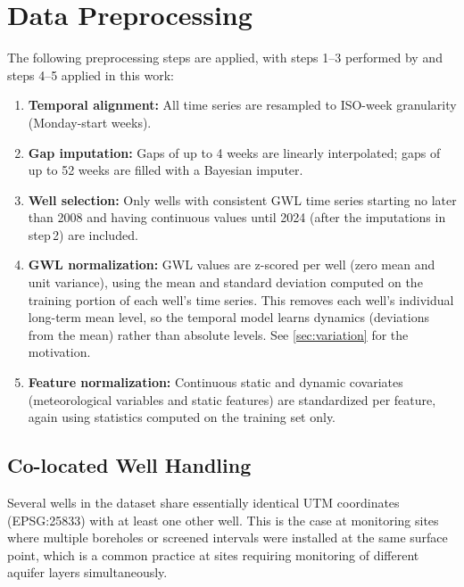 \section{Data Preprocessing}
\label{sec:preprocessing}

The following preprocessing steps are applied, with steps 1--3 performed by \citet{kunz2025} and steps 4--5 applied in this work:

\begin{enumerate}
  \item \textbf{Temporal alignment:} All time series are resampled to ISO-week granularity
  (Monday-start weeks).
  \item \textbf{Gap imputation:} Gaps of up to 4 weeks are linearly interpolated; gaps of up to
  52 weeks are filled with a Bayesian imputer.
  \item \textbf{Well selection:} Only wells with consistent GWL time series starting no later
  than 2008 and having continuous values until 2024 (after the imputations in step\,2) are included.
  \item \textbf{GWL normalization:} GWL values are z-scored per well (zero mean and
  unit variance), using the mean and standard deviation computed on the training portion of
  each well's time series. This removes each well's individual long-term mean level, so the
  temporal model learns dynamics (deviations from the mean) rather than absolute levels. See
  \cref{sec:variation} for the motivation.
  \item \textbf{Feature normalization:} Continuous static and dynamic covariates (meteorological
  variables and static features) are standardized per feature, again using statistics computed 
  on the training set only.
\end{enumerate}

\subsection{Co-located Well Handling}
\label{sec:deduplication}

Several wells in the dataset share essentially
identical UTM coordinates (EPSG:25833) with at least one other well. This is the case at monitoring 
sites where multiple boreholes or screened intervals were installed at the same surface point, 
which is a common practice at sites requiring monitoring of different aquifer layers simultaneously.

